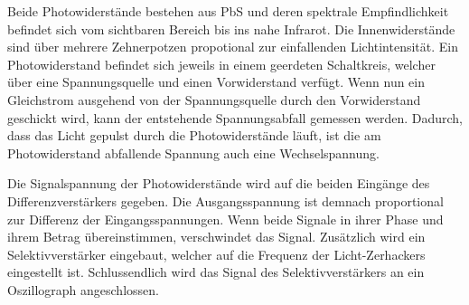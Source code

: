 Beide Photowiderstände bestehen aus PbS und deren spektrale Empfindlichkeit befindet sich vom sichtbaren Bereich bis 
ins nahe Infrarot. Die Innenwiderstände sind über mehrere Zehnerpotzen propotional zur einfallenden
Lichtintensität. Ein Photowiderstand befindet sich jeweils in einem geerdeten Schaltkreis, welcher über eine Spannungsquelle 
und einen Vorwiderstand verfügt. Wenn nun ein Gleichstrom ausgehend von der Spannungsquelle durch den Vorwiderstand geschickt 
wird, kann der entstehende Spannungsabfall gemessen werden. Dadurch, dass das Licht gepulst durch die Photowiderstände läuft,
ist die am Photowiderstand abfallende Spannung auch eine Wechselspannung.

Die Signalspannung der Photowiderstände wird auf die beiden Eingänge des 
Differenzverstärkers gegeben. Die Ausgangsspannung ist demnach proportional zur Differenz der Eingangsspannungen.
Wenn beide Signale in ihrer Phase und ihrem Betrag übereinstimmen, verschwindet das Signal.
Zusätzlich wird ein Selektivverstärker eingebaut, welcher auf die Frequenz der Licht-Zerhackers eingestellt ist.
Schlussendlich wird das Signal des Selektivverstärkers an ein Oszillograph angeschlossen.

